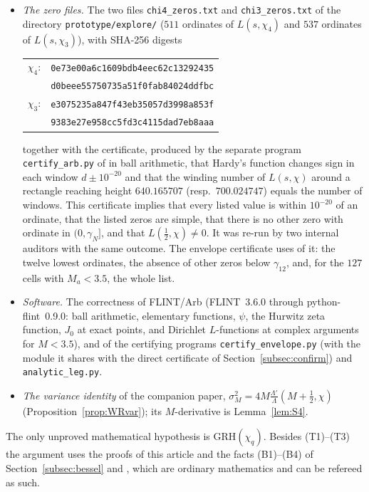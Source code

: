 \documentclass[11pt]{amsart}
\theoremstyle{definition}
\numberwithin{equation}{section}
\begin{document}
\begin{itemize}
\item[\textup{(T1)}] \emph{The zero files.} The two files
\texttt{chi4\_zeros.txt} and \texttt{chi3\_zeros.txt} of the
directory \texttt{prototype/explore/} ($511$ ordinates of
$L(s,\chi_4)$ and $537$ ordinates of $L(s,\chi_3)$), with SHA-256
digests
\begin{center}
\small
\begin{tabular}{ll}
$\chi_4$: & \texttt{0e73e00a6c1609bdb4eec62c13292435}\\
          & \texttt{d0beee55750735a51f0fab84024ddfbc}\\
$\chi_3$: & \texttt{e3075235a847f43eb35057d3998a853f}\\
          & \texttt{9383e27e958cc5fd3c4115dad7eb8aaa}
\end{tabular}
\end{center}
together with the certificate, produced by the separate program
\texttt{certify\_arb.py} of \cite[\S7]{WR} in ball arithmetic,
that Hardy's function changes sign in each window $d\pm10^{-20}$ and
that the winding number of $L(s,\chi)$ around a rectangle reaching
height $640.165707$ (resp.\ $700.024747$) equals the number of
windows. This certificate implies that every listed value is within
$10^{-20}$ of an ordinate, that the listed zeros are simple, that
there is no other zero with ordinate in $(0,\gamma_N]$, and that
$L(\tfrac12,\chi)\ne0$. It was re-run by two internal auditors with
the same outcome. The envelope certificate uses of it: the twelve
lowest ordinates, the absence of other zeros below $\gamma_{12}$, and,
for the $127$ cells with $M_a<3.5$, the whole list.
\item[\textup{(T2)}] \emph{Software.} The correctness of FLINT/Arb
(FLINT~3.6.0 through python-flint~0.9.0: ball arithmetic, elementary
functions, $\psi$, the Hurwitz zeta function, $J_0$ at exact points,
and Dirichlet $L$-functions at complex arguments for $M<3.5$), and of
the certifying programs \texttt{certify\_envelope.py} (with the module
it shares with the direct certificate of
Section~\ref{subsec:confirm}) and \texttt{analytic\_leg.py}.
\item[\textup{(T3)}] \emph{The variance identity} of the companion
paper, $\sigma_M^2=4M\frac{\Lambda'}{\Lambda}(M+\tfrac12,\chi)$
\cite[eq.~(8)]{WR} (Proposition~\ref{prop:WRvar}); its $M$-derivative
is Lemma~\ref{lem:S4}.
\end{itemize}
The only unproved mathematical hypothesis is GRH$(\chi_q)$. Besides
(T1)--(T3) the argument uses the proofs of this article and the facts
(B1)--(B4) of Section~\ref{subsec:bessel} and
\cite[Lemma~7(b)]{WR}, which are ordinary mathematics and can be
refereed as such.
\end{document}
